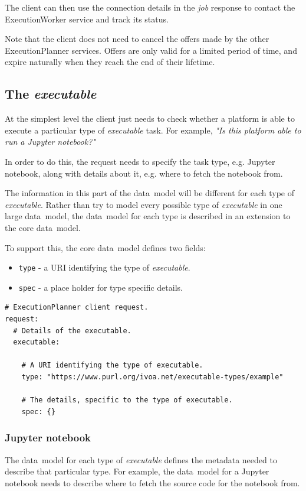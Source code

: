 \documentclass[11pt,a4paper]{ivoa}
\newcommand{\datamodel} {data~model}
\newcommand{\execplanner} {ExecutionPlanner}
\newcommand{\execworker} {ExecutionWorker}
\newcommand{\jupyternotebook} {Jupyter notebook}
\newcommand{\codeword}[1] {\texttt{#1}}
\newcommand{\executable} {\textit{executable}}
\newcommand{\excutabletask} {\textit{executable} task}
\newcommand{\workerjob} {\textit{job}}
\begin{document}
The client can then use the connection details in the \workerjob{} response to contact
the \execworker{} service and track its status.

Note that the client does not need to cancel the offers made by the other \execplanner{} services.
Offers are only valid for a limited period of time, and expire naturally when they reach the end
of their lifetime.

\subsection{The \executable{}}
\label{executable}

At the simplest level the client just needs to check whether a platform is able to execute a particular
type of \excutabletask{}.
For example, \textit{"Is this platform able to run a \jupyternotebook{}?"}

In order to do this, the request needs to specify the task type, e.g. \jupyternotebook{},
along with details about it, e.g. where to fetch the notebook from.

The information in this part of the \datamodel{} will be different for each type of \executable{}.
Rather than try to model every possible type of \executable{} in one large \datamodel{},
the \datamodel{} for each type is described in an extension to the core \datamodel{}.

To support this, the core \datamodel{} defines two fields:
\begin{itemize}
  \item \codeword{type} - a URI identifying the type of \executable{}.
  \item \codeword{spec} - a place holder for type specific details.
\end{itemize}

\begin{lstlisting}[]
# ExecutionPlanner client request.
request:
  # Details of the executable.
  executable:

    # A URI identifying the type of executable.
    type: "https://www.purl.org/ivoa.net/executable-types/example"

    # The details, specific to the type of executable.
    spec: {}
\end{lstlisting}

\subsubsection{\jupyternotebook{}}
\label{jupyternotebook}
The \datamodel{} for each type of \executable{} defines the metadata needed to
describe that particular type.
For example, the \datamodel{} for a \jupyternotebook{} needs to describe where
to fetch the source code for the notebook from.
\end{document}
